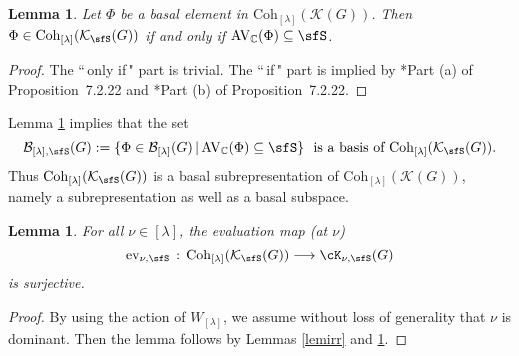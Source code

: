 \documentclass[12pt,a4paper]{amsart}
\newcommand{\AV}{\mathrm{AV}}
\def\subset{\subseteq}
\newcommand{\CK}{{\mathcal {K}}}
\newcommand{\be}{\begin {equation}}
\newcommand{\ee}{\end {equation}}
\numberwithin{equation}{section}
\newtheorem{lem}[thm]{Lemma}
\theoremstyle{remark}
\def\Coh{\mathrm{Coh}}
\newcommand{\Lam}{{[\lambda]}}
\newcommand{\Grt}{\cK}
\begin{document}
\begin{lem}\label{lemirr11}
Let $\Phi$ be a basal element in $\Coh_{[\lambda]}(\CK(G))$. Then  $\Phi \in \Coh_{[\lambda]}(\CK_\sfS(G))$ if and only if $\AV_\C(\Phi)\subset \sfS$.
         \end{lem}
\begin{proof}
The ``$\,$only if$\,$" part is trivial. The ``$\,$if$\,$" part is implied by \cite{Vg}*{Part (a) of Proposition~7.2.22} and
\cite{Vg}*{Part (b) of Proposition~7.2.22}.
\end{proof}

Lemma \ref{lemirr11} implies that the set
\be\label{basiss}
   \mathcal B_{\Lam,\sfS}(G):=\{\Phi\in \mathcal B_\Lam(G)\,|\,\AV_\C(\Phi)\subset \sfS\}
  \  \textrm{
    is a basis of $ \Coh_{[\lambda]}(\CK_\sfS(G))$.}
    \ee
     Thus $ \Coh_{[\lambda]}(\CK_\sfS(G))$ is a basal subrepresentation of $ \Coh_{[\lambda]}(\CK(G))$, namely a subrepresentation as well as a basal subspace.

\begin{lem}\label{sur111}
For all $\nu\in\Lam$, the evaluation map  (at $\nu$)
  \[
    \mathrm{ev}_{\nu , \sfS} \, :\, \Coh_{[\lambda]}(\CK_\sfS(G)) \longrightarrow \Grt_{\nu, \sfS}(G)
  \]
 is surjective.
\end{lem}
\begin{proof}
By using the action of $W_\Lam$, we assume without loss of generality that $\nu$ is dominant. Then the lemma follows by Lemmas \ref{lemirr} and \ref{lemirr11}.
\end{proof}
\end{document}
